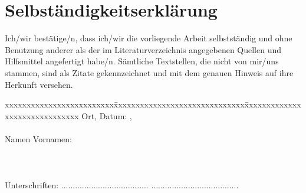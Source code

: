 \chapter*{Selbständigkeitserklärung}
\label{chap:selbstaendigkeitserklaerung}

\vspace*{10mm} 

Ich/wir bestätige/n, dass ich/wir die vorliegende Arbeit selbstständig und ohne Benutzung anderer als der im Literaturverzeichnis angegebenen Quellen und Hilfsmittel angefertigt habe/n. Sämtliche Textstellen, die nicht von mir/uns stammen, sind als Zitate gekennzeichnet und mit dem genauen Hinweis auf ihre Herkunft versehen. 

\vspace{15mm}

\begin{tabbing}
xxxxxxxxxxxxxxxxxxxxxxxxx\=xxxxxxxxxxxxxxxxxxxxxxxxxxxxxx\=xxxxxxxxxxxxxxxxxxxxxxxxxxxxxx\kill
Ort, Datum:		, \versiondate \\ \\ 
Namen Vornamen:	 	 \\ \\ \\ \\ 
Unterschriften:	\> ......................................\> ...................................... \\
\end{tabbing}
